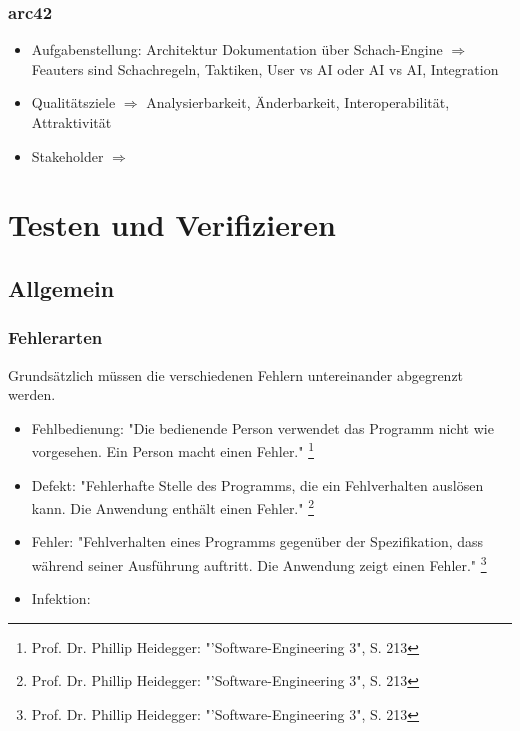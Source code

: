 \documentclass[a4paper,10pt]{scrartcl}
\begin{document}
\subsubsection{arc42}
\begin{itemize}
    \item Aufgabenstellung: Architektur Dokumentation über Schach-Engine
    $\Rightarrow$ Feauters sind Schachregeln, Taktiken, User vs AI oder AI vs AI, Integration
    \item Qualitätsziele
    $\Rightarrow$ Analysierbarkeit, Änderbarkeit, Interoperabilität, Attraktivität
    \item Stakeholder
    $\Rightarrow$
\end{itemize}

\section{Testen und Verifizieren}
\subsection{Allgemein}
\subsubsection{Fehlerarten}
Grundsätzlich müssen die verschiedenen Fehlern untereinander abgegrenzt werden. 
\begin{itemize}
	\item Fehlbedienung: "Die bedienende Person verwendet das Programm nicht wie vorgesehen. Ein Person macht einen Fehler." 
	\footnote{Prof. Dr. Phillip Heidegger: "'Software-Engineering 3", S. 213}
	\item Defekt: "Fehlerhafte Stelle des Programms, die ein Fehlverhalten auslösen kann. Die Anwendung enthält einen Fehler." \footnote{Prof. Dr. Phillip Heidegger: "'Software-Engineering 3", S. 213}
	\item Fehler: "Fehlverhalten eines Programms gegenüber der Spezifikation, dass während seiner Ausführung auftritt. Die Anwendung zeigt einen Fehler."
	\footnote{Prof. Dr. Phillip Heidegger: "'Software-Engineering 3", S. 213}
	\item Infektion: 
\end{itemize}
\end{document}
